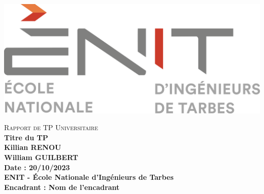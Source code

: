 \documentclass[a4paper,12pt]{article}
\begin{document}
\begin{titlepage}
    \begin{minipage}[t]{0.4\textwidth}
        \includegraphics[width=\textwidth]{media/logo-enit-2454399073.png} \\[1cm] %
    \end{minipage}
    \centering
    \vspace*{2cm}
    
    {\scshape \Large Rapport de TP Universitaire} \\[0.5cm] %
    {\Huge \textbf{Titre du TP}} \\[1.5cm] %
    {\large \textbf{Killian RENOU \\ William GUILBERT}} \\[0.5cm] %
    {\large \textbf{Date : 20/10/2023}} \\[0.5cm] %
    {\large \textbf{ENIT - École Nationale d'Ingénieurs de Tarbes}} \\[0.5cm] %
    \vfill
    {\large \textbf{Encadrant : Nom de l'encadrant}} %
\end{titlepage}
\end{document}
